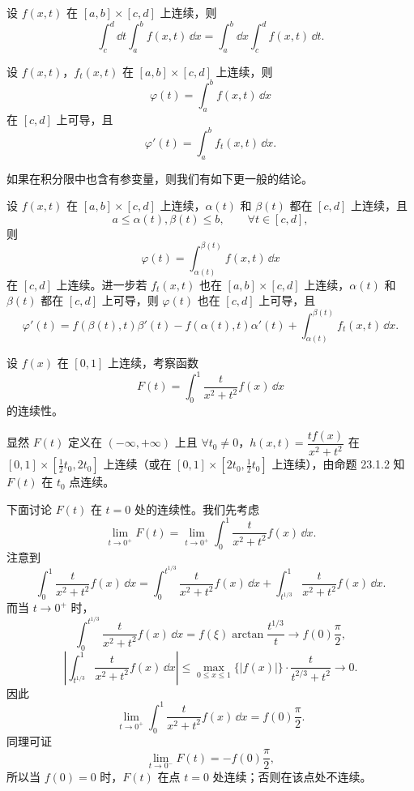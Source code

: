 \begin{xproposition}[23.1.3（交换积分次序）]
设 $f(x,t)$ 在 $[a,b]\times[c,d]$ 上连续，则
\[
  \int_c^d\dd t\int_a^b f(x,t)\,\dd x
  =\int_a^b\dd x\int_c^d f(x,t)\,\dd t.
\]
\end{xproposition}

\begin{xproposition}[23.1.4（可微性）]
设 $f(x,t)$，$f_t(x,t)$ 在 $[a,b]\times[c,d]$ 上连续，则
\[
  \varphi(t)=\int_a^b f(x,t)\,\dd x
\]
在 $[c,d]$ 上可导，且
\[
  \varphi'(t)=\int_a^b f_t(x,t)\,\dd x.
\]
\end{xproposition}

如果在积分限中也含有参变量，则我们有如下更一般的结论。

\begin{xproposition}[23.1.5]
设 $f(x,t)$ 在 $[a,b]\times[c,d]$ 上连续，$\alpha(t)$ 和 $\beta(t)$ 都在 $[c,d]$ 上连续，且
\[
  a\leqslant \alpha(t),\beta(t)\leqslant b,\qquad \forall t\in[c,d],
\]
则
\[
  \varphi(t)=\int_{\alpha(t)}^{\beta(t)}f(x,t)\,\dd x
\]
在 $[c,d]$ 上连续。进一步若 $f_t(x,t)$ 也在 $[a,b]\times[c,d]$ 上连续，$\alpha(t)$ 和 $\beta(t)$ 都在 $[c,d]$ 上可导，则 $\varphi(t)$ 也在 $[c,d]$ 上可导，且
\[
  \varphi'(t)=f(\beta(t),t)\beta'(t)-f(\alpha(t),t)\alpha'(t)
  +\int_{\alpha(t)}^{\beta(t)}f_t(x,t)\,\dd x.
\]
\end{xproposition}

\begin{xexample}[23.1.1]
设 $f(x)$ 在 $[0,1]$ 上连续，考察函数
\[
  F(t)=\int_0^1\frac{t}{x^2+t^2}f(x)\,\dd x
\]
的连续性。
\end{xexample}
\begin{xsolution}
显然 $F(t)$ 定义在 $(-\infty,+\infty)$ 上且 $\forall t_0\neq0$，$h(x,t)=\dfrac{tf(x)}{x^2+t^2}$ 在 $[0,1]\times[\frac12t_0,2t_0]$ 上连续（或在 $[0,1]\times[2t_0,\frac12t_0]$ 上连续），由命题 23.1.2 知 $F(t)$ 在 $t_0$ 点连续。

下面讨论 $F(t)$ 在 $t=0$ 处的连续性。我们先考虑
\[
  \lim_{t\to0^+}F(t)=\lim_{t\to0^+}\int_0^1\frac{t}{x^2+t^2}f(x)\,\dd x.
\]
注意到
\[
  \int_0^1\frac{t}{x^2+t^2}f(x)\,\dd x
  =\int_0^{t^{1/3}}\frac{t}{x^2+t^2}f(x)\,\dd x
  +\int_{t^{1/3}}^1\frac{t}{x^2+t^2}f(x)\,\dd x.
\]
而当 $t\to0^+$ 时，
\[
  \int_0^{t^{1/3}}\frac{t}{x^2+t^2}f(x)\,\dd x
  =f(\xi)\arctan\frac{t^{1/3}}{t}\to f(0)\frac{\pi}{2},
\]
\[
  \left|\int_{t^{1/3}}^1\frac{t}{x^2+t^2}f(x)\,\dd x\right|
  \leqslant \max_{0\leqslant x\leqslant1}\{|f(x)|\}\cdot
  \frac{t}{t^{2/3}+t^2}\to0.
\]
因此
\[
  \lim_{t\to0^+}\int_0^1\frac{t}{x^2+t^2}f(x)\,\dd x=f(0)\frac{\pi}{2}.
\]
同理可证
\[
  \lim_{t\to0^-}F(t)=-f(0)\frac{\pi}{2},
\]
所以当 $f(0)=0$ 时，$F(t)$ 在点 $t=0$ 处连续；否则在该点处不连续。
\end{xsolution}

